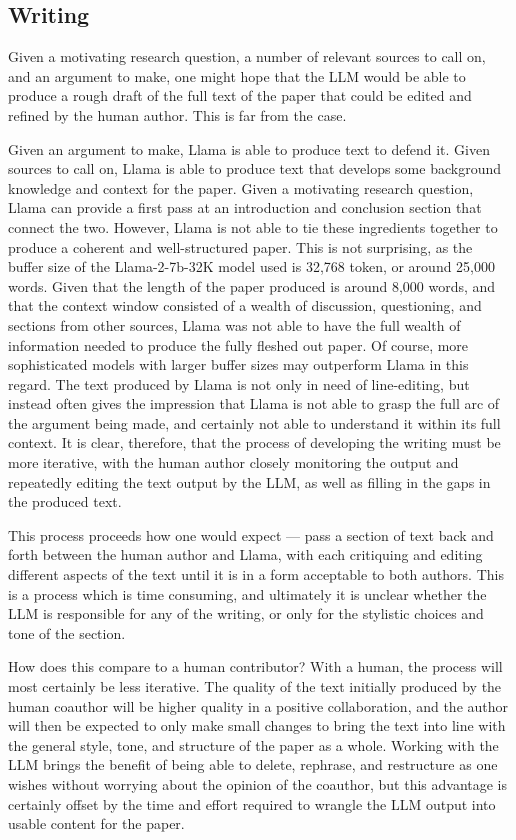 \subsection{Writing}
Given a motivating research question, a number of relevant sources to call on,
and an argument to make, one might hope that the LLM would be able to produce
a rough draft of the full text of the paper that could be edited and refined by
the human author. This is far from the case.

Given an argument to make, Llama is able to produce text to defend it. Given 
sources to call on, Llama is able to produce text that develops some background
knowledge and context for the paper. Given a motivating research question, Llama
can provide a first pass at an introduction and conclusion section that connect
the two. However, Llama is not able to tie these ingredients together to produce
a coherent and well-structured paper. This is not surprising, as the buffer size
of the Llama-2-7b-32K model used is 32,768 token, or around 25,000 words. Given
that the length of the paper produced is around 8,000 words, and that the
context window consisted of a wealth of discussion, questioning, and sections 
from other sources, Llama was not able to have the full wealth of information
needed to produce the fully fleshed out paper. Of course, more sophisticated 
models with larger buffer sizes may outperform Llama in this regard. The text
produced by Llama is not only in need of line-editing, but instead often gives
the impression that Llama is not able to grasp the full arc of the argument
being made, and certainly not able to understand it within its full context.
It is clear, therefore, that the process of developing the writing must be more
iterative, with the human author closely monitoring the output and repeatedly
editing the text output by the LLM, as well as filling in the gaps in the
produced text. 

This process proceeds how one would expect — pass a section of text back and
forth between the human author and Llama, with each critiquing and editing
different aspects of the text until it is in a form acceptable to both authors.
This is a process which is time consuming, and ultimately it is unclear whether
the LLM is responsible for any of the writing, or only for the stylistic choices
and tone of the section. 

How does this compare to a human contributor? With a human, the process will 
most certainly be less iterative. The quality of the text initially produced by
the human coauthor will be higher quality in a positive collaboration, and the
author will then be expected to only make small changes to bring the text into
line with the general style, tone, and structure of the paper as a whole.
Working with the LLM brings the benefit of being able to delete, rephrase, and 
restructure as one wishes without worrying about the opinion of the coauthor,
but this advantage is certainly offset by the time and effort required to 
wrangle the LLM output into usable content for the paper.

